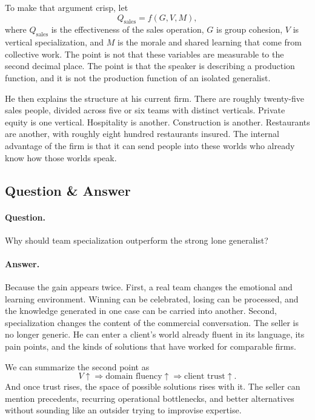 To make that argument crisp, let
\begin{equation}
Q_{\text{sales}}=f(G,V,M),
\end{equation}
where \(Q_{\text{sales}}\) is the effectiveness of the sales operation, \(G\) is group cohesion, \(V\) is vertical specialization, and \(M\) is the morale and shared learning that come from collective work. The point is not that these variables are measurable to the second decimal place. The point is that the speaker is describing a production function, and it is not the production function of an isolated generalist.

He then explains the structure at his current firm. There are roughly twenty-five sales people, divided across five or six teams with distinct verticals. Private equity is one vertical. Hospitality is another. Construction is another. Restaurants are another, with roughly eight hundred restaurants insured. The internal advantage of the firm is that it can send people into these worlds who already know how those worlds speak.

\subsection{Question \& Answer}

\paragraph{Question.} Why should team specialization outperform the strong lone generalist?

\paragraph{Answer.} Because the gain appears twice. First, a real team changes the emotional and learning environment. Winning can be celebrated, losing can be processed, and the knowledge generated in one case can be carried into another. Second, specialization changes the content of the commercial conversation. The seller is no longer generic. He can enter a client's world already fluent in its language, its pain points, and the kinds of solutions that have worked for comparable firms.

We can summarize the second point as
\begin{equation}
V \uparrow \Longrightarrow \text{domain fluency} \uparrow \Longrightarrow \text{client trust} \uparrow.
\end{equation}
And once trust rises, the space of possible solutions rises with it. The seller can mention precedents, recurring operational bottlenecks, and better alternatives without sounding like an outsider trying to improvise expertise.

